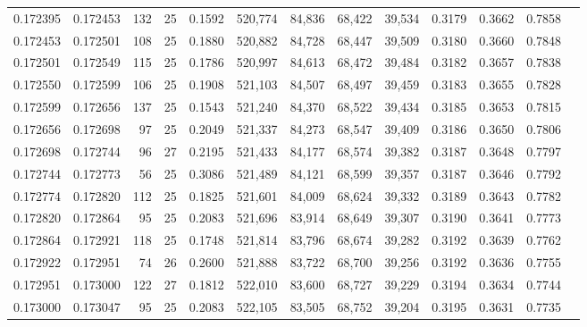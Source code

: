 \begin{tabular}{rrrrrrrrrrrrr}
0.172395 & 0.172453 &   132 &  25 &                                     0.1592 & 520,774 &  84,836 &  68,422 &  39,534 & 0.3179 & 0.3662 & 0.7858 \\
0.172453 & 0.172501 &   108 &  25 &                                     0.1880 & 520,882 &  84,728 &  68,447 &  39,509 & 0.3180 & 0.3660 & 0.7848 \\
0.172501 & 0.172549 &   115 &  25 &                                     0.1786 & 520,997 &  84,613 &  68,472 &  39,484 & 0.3182 & 0.3657 & 0.7838 \\
0.172550 & 0.172599 &   106 &  25 &                                     0.1908 & 521,103 &  84,507 &  68,497 &  39,459 & 0.3183 & 0.3655 & 0.7828 \\
0.172599 & 0.172656 &   137 &  25 &                                     0.1543 & 521,240 &  84,370 &  68,522 &  39,434 & 0.3185 & 0.3653 & 0.7815 \\
0.172656 & 0.172698 &    97 &  25 &                                     0.2049 & 521,337 &  84,273 &  68,547 &  39,409 & 0.3186 & 0.3650 & 0.7806 \\
0.172698 & 0.172744 &    96 &  27 &                                     0.2195 & 521,433 &  84,177 &  68,574 &  39,382 & 0.3187 & 0.3648 & 0.7797 \\
0.172744 & 0.172773 &    56 &  25 &                                     0.3086 & 521,489 &  84,121 &  68,599 &  39,357 & 0.3187 & 0.3646 & 0.7792 \\
0.172774 & 0.172820 &   112 &  25 &                                     0.1825 & 521,601 &  84,009 &  68,624 &  39,332 & 0.3189 & 0.3643 & 0.7782 \\
0.172820 & 0.172864 &    95 &  25 &                                     0.2083 & 521,696 &  83,914 &  68,649 &  39,307 & 0.3190 & 0.3641 & 0.7773 \\
0.172864 & 0.172921 &   118 &  25 &                                     0.1748 & 521,814 &  83,796 &  68,674 &  39,282 & 0.3192 & 0.3639 & 0.7762 \\
0.172922 & 0.172951 &    74 &  26 &                                     0.2600 & 521,888 &  83,722 &  68,700 &  39,256 & 0.3192 & 0.3636 & 0.7755 \\
0.172951 & 0.173000 &   122 &  27 &                                     0.1812 & 522,010 &  83,600 &  68,727 &  39,229 & 0.3194 & 0.3634 & 0.7744 \\
0.173000 & 0.173047 &    95 &  25 &                                     0.2083 & 522,105 &  83,505 &  68,752 &  39,204 & 0.3195 & 0.3631 & 0.7735 \\

\end{tabular}
